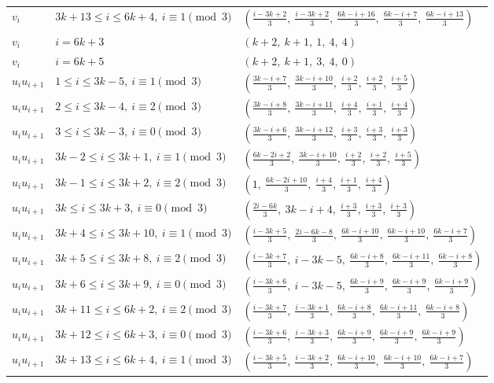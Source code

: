 \begin{longtable}{lll}
$v_i$ & $3k+13 \le i \le 6k+4,\ i \equiv 1 \pmod{3}$ & $(\frac{i-3k+2}{3},\ \frac{i-3k+2}{3},\ \frac{6k-i+16}{3},\ \frac{6k-i+7}{3},\ \frac{6k-i+13}{3})$ \\
$v_i$ & $i = 6k+3$ & $(k+2,\ k+1,\ 1,\ 4,\ 4)$ \\
$v_i$ & $i = 6k+5$ & $(k+2,\ k+1,\ 3,\ 4,\ 0)$ \\
$u_i u_{i+1}$ & $1 \le i \le 3k-5,\ i \equiv 1 \pmod{3}$ & $(\frac{3k-i+7}{3},\ \frac{3k-i+10}{3},\ \frac{i+2}{3},\ \frac{i+2}{3},\ \frac{i+5}{3})$ \\
$u_i u_{i+1}$ & $2 \le i \le 3k-4,\ i \equiv 2 \pmod{3}$ & $(\frac{3k-i+8}{3},\ \frac{3k-i+11}{3},\ \frac{i+4}{3},\ \frac{i+1}{3},\ \frac{i+4}{3})$ \\
$u_i u_{i+1}$ & $3 \le i \le 3k-3,\ i \equiv 0 \pmod{3}$ & $(\frac{3k-i+6}{3},\ \frac{3k-i+12}{3},\ \frac{i+3}{3},\ \frac{i+3}{3},\ \frac{i+3}{3})$ \\
$u_i u_{i+1}$ & $3k-2 \le i \le 3k+1,\ i \equiv 1 \pmod{3}$ & $(\frac{6k-2i+2}{3},\ \frac{3k-i+10}{3},\ \frac{i+2}{3},\ \frac{i+2}{3},\ \frac{i+5}{3})$ \\
$u_i u_{i+1}$ & $3k-1 \le i \le 3k+2,\ i \equiv 2 \pmod{3}$ & $(1,\ \frac{6k-2i+10}{3},\ \frac{i+4}{3},\ \frac{i+1}{3},\ \frac{i+4}{3})$ \\
$u_i u_{i+1}$ & $3k \le i \le 3k+3,\ i \equiv 0 \pmod{3}$ & $(\frac{2i-6k}{3},\ 3k-i+4,\ \frac{i+3}{3},\ \frac{i+3}{3},\ \frac{i+3}{3})$ \\
$u_i u_{i+1}$ & $3k+4 \le i \le 3k+10,\ i \equiv 1 \pmod{3}$ & $(\frac{i-3k+5}{3},\ \frac{2i-6k-8}{3},\ \frac{6k-i+10}{3},\ \frac{6k-i+10}{3},\ \frac{6k-i+7}{3})$ \\
$u_i u_{i+1}$ & $3k+5 \le i \le 3k+8,\ i \equiv 2 \pmod{3}$ & $(\frac{i-3k+7}{3},\ i-3k-5,\ \frac{6k-i+8}{3},\ \frac{6k-i+11}{3},\ \frac{6k-i+8}{3})$ \\
$u_i u_{i+1}$ & $3k+6 \le i \le 3k+9,\ i \equiv 0 \pmod{3}$ & $(\frac{i-3k+6}{3},\ i-3k-5,\ \frac{6k-i+9}{3},\ \frac{6k-i+9}{3},\ \frac{6k-i+9}{3})$ \\
$u_i u_{i+1}$ & $3k+11 \le i \le 6k+2,\ i \equiv 2 \pmod{3}$ & $(\frac{i-3k+7}{3},\ \frac{i-3k+1}{3},\ \frac{6k-i+8}{3},\ \frac{6k-i+11}{3},\ \frac{6k-i+8}{3})$ \\
$u_i u_{i+1}$ & $3k+12 \le i \le 6k+3,\ i \equiv 0 \pmod{3}$ & $(\frac{i-3k+6}{3},\ \frac{i-3k+3}{3},\ \frac{6k-i+9}{3},\ \frac{6k-i+9}{3},\ \frac{6k-i+9}{3})$ \\
$u_i u_{i+1}$ & $3k+13 \le i \le 6k+4,\ i \equiv 1 \pmod{3}$ & $(\frac{i-3k+5}{3},\ \frac{i-3k+2}{3},\ \frac{6k-i+10}{3},\ \frac{6k-i+10}{3},\ \frac{6k-i+7}{3})$ \\

\end{longtable}
